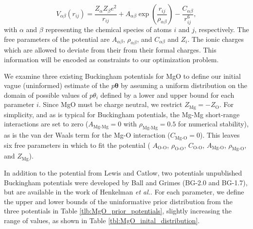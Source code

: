 \begin{equation}
	V_{\alpha\beta}(r_{ij}) =
			\frac{Z_{\alpha}Z_{\beta}e^2}{r_{ij}}
			+ A_{\alpha\beta} \exp \left(\frac{r_{ij}}
																				{\rho_{\alpha\beta}}
															\right)
			- \frac{C_{\alpha\beta}}
			       {r_{ij}^6},
\end{equation}
with $\alpha$ and $\beta$ representing the chemical species of atoms $i$ and $j$, respectively.  The free parameters of the potential are $A_{\alpha\beta}$, $\rho_{\alpha\beta}$, and $C_{\alpha\beta}$ and $Z_i$.  The ionic charges which are allowed to deviate from their from their formal charges.  This information will be encoded as constraints to our optimization problem.

We examine three existing Buckingham potentials for MgO to define our initial vague (uninformed) estimate of the $p{\bm{\theta}}$ by assuming a uniform distribution on the domain of possible values of $p{\theta_i}$ defined by a lower and upper bound for each parameter $i$. Since MgO must be charge neutral, we restrict $Z_{\text{Mg}}= -Z_{\text{O}}$. For simplicity, and as is typical for Buckingham potentials, the Mg-Mg short-range interactions are set to zero ($A_\text{Mg-Mg}=0$ with $\rho_{\text{Mg-Mg}}=0.5$  for numerical stability), as is the van der Waals term for the Mg-O interaction ($C_{\text{Mg-O}}=0$). This leaves six free parameters in which to fit the potential (
$A_{\text{O-O}}$,
$\rho_{\text{O-O}}$,
$C_{\text{O-O}}$,
$A_{\text{Mg-O}}$,
$\rho_{\text{Mg-O}}$, and
$Z_{\text{Mg}}$).

In addition to the potential from Lewis and Catlow, two potentials unpublished Buckingham potentials were developed by Ball and Grimes (BG-2.0 and BG-1.7), but are available in the work of Henkelman \emph{et al.}\cite{henkelman2005_buckingham_MgO}.  For each parameter, we define the upper and lower bounds of the uninformative prior distribution from the three potentials in Table \ref{tlb:MgO_prior_potentials}, slightly increasing the range of values, as shown in Table \ref{tbl:MgO_inital_distribution}.

